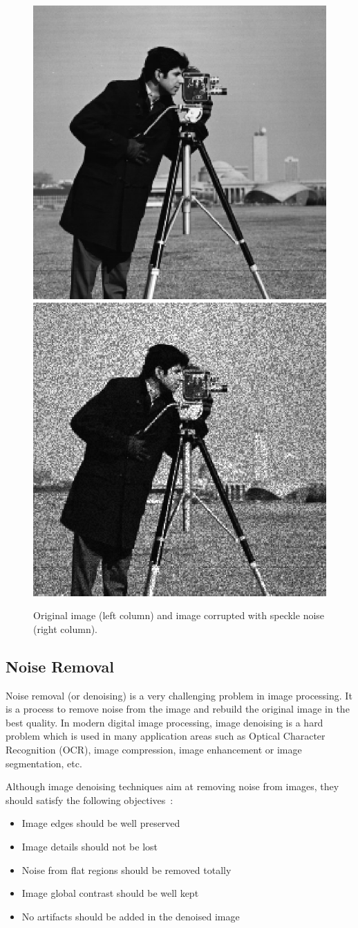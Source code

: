 \begin{figure}
    \centering 
    \includegraphics[width=0.4\columnwidth]{images/salt_pepper_origin.jpg}
    \includegraphics[width=0.4\columnwidth]{images/speckle_noise.jpg}
    \caption{Original image (left column) and image corrupted with speckle noise (right column).}
    \label{fig:speckle_noise}
\end{figure}

\subsection{Noise Removal}

Noise removal (or denoising) is a very challenging problem in image processing. It is a process to remove noise from the image and rebuild the original image in the best quality. In modern digital image processing, image denoising is a hard problem which is used in many application areas such as Optical Character Recognition (OCR), image compression, image enhancement or image segmentation, etc.

Although image denoising techniques aim at removing noise from images, they should satisfy the following objectives~\cite{liu2008automatic}:

\begin{itemize}
\item Image edges should be well preserved
\item Image details should not be lost
\item Noise from flat regions should be removed totally
\item Image global contrast should be well kept
\item No artifacts should be added in the denoised image
\end{itemize}

